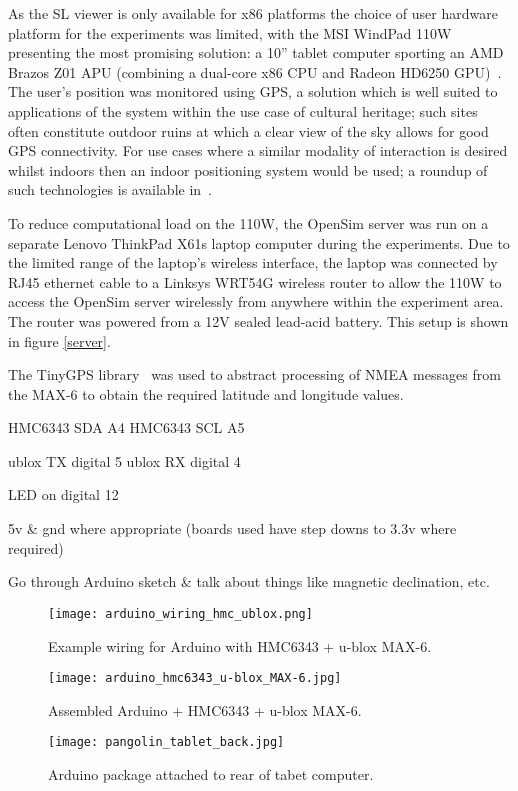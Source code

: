 As the SL viewer is only available for x86 platforms the choice of user hardware platform for the experiments was limited, with the MSI WindPad 110W presenting the most promising solution: a 10'' tablet computer sporting an AMD Brazos Z01 APU (combining a dual-core x86 CPU and Radeon HD6250 GPU)~\cite{Micro-StarInt'lCo.}. The user's position was monitored using GPS, a solution which is well suited to applications of the system within the use case of cultural heritage; such sites often constitute outdoor ruins at which a clear view of the sky allows for good GPS connectivity. For use cases where a similar modality of interaction is desired whilst indoors then an indoor positioning system would be used; a roundup of such technologies is available in~\cite{Mautz2012}.

To reduce computational load on the 110W, the OpenSim server was run on a separate Lenovo ThinkPad X61s laptop computer during the experiments. Due to the limited range of the laptop's wireless interface, the laptop was connected by RJ45 ethernet cable to a Linksys WRT54G wireless router to allow the 110W to access the OpenSim server wirelessly from anywhere within the experiment area. The router was powered from a 12V sealed lead-acid battery. This setup is shown in figure \ref{server}.



The TinyGPS library~\cite{Hart} was used to abstract processing of NMEA messages from the MAX-6 to obtain the required latitude and longitude values.

HMC6343 SDA A4
HMC6343 SCL A5

ublox TX digital 5
ublox RX digital 4

LED on digital 12

5v \& gnd where appropriate (boards used have step downs to 3.3v where required)

Go through Arduino sketch \& talk about things like magnetic declination, etc.

\begin{figure}[h]
\centering
  \texttt{[image: arduino\_wiring\_hmc\_ublox.png]}
  \caption{Example wiring for Arduino with HMC6343 + u-blox MAX-6.}
  \label{arduino_wiring_hmc_ublox.png}
\end{figure}

\begin{figure}[h]
\centering
\begin{minipage}{.5\textwidth}
 	\centering
 	\texttt{[image: arduino\_hmc6343\_u-blox\_MAX-6.jpg]}
 	\caption{Assembled Arduino + HMC6343 + u-blox MAX-6.}
	\label{arduino_hmc6343_u-blox_MAX-6.jpg}
\end{minipage}%
\begin{minipage}{.5\textwidth}
  \centering
  \texttt{[image: pangolin\_tablet\_back.jpg]}
    \caption{Arduino package attached to rear of tabet computer.}
    \label{pangolin_tablet_back.jpg}
\end{minipage}
\end{figure}

